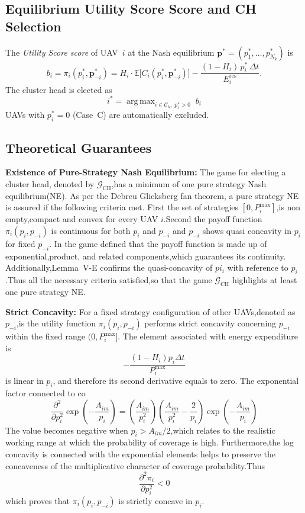 \documentclass[journal]{IEEEtran}
\DeclareMathOperator*{\argmax}{arg\,max}
\begin{document}
\subsection{Equilibrium Utility Score Score and CH Selection}

The \emph{Utility Score score} of UAV~$i$ at the Nash equilibrium
$\mathbf{p}^{*}=(p_{1}^{*},\ldots,p_{N_{k}}^{*})$ is
\begin{equation}\label{eq:Utility Score}
  b_{i}=\pi_{i}(p_{i}^{*},\mathbf{p}_{-i}^{*})
  =H_{i}\cdot\mathbb{E}\bigl[C_{i}(p_{i}^{*},\mathbf{p}_{-i}^{*})\bigr]
  -\frac{(1-H_{i})\,p_{i}^{*}\,\Delta t}{E_i^{\mathrm{res}}}.
\end{equation}
The cluster head is elected as
\begin{equation}\label{eq:CH}
  i^{*}=\argmax_{i\in\mathcal{C}_{k},\;p_{i}^{*}>0}\;b_{i}
\end{equation}
UAVs with $p_{i}^{*}=0$ (Case~C) are automatically
excluded.


\subsection{Theoretical Guarantees}

\textbf{Existence of Pure-Strategy Nash Equilibrium:}
The game for electing a cluster head, denoted by $\mathcal{G}_{\mathrm{CH}}$,has a minimum of one pure strategy Nash equilibrium(NE). As per the Debreu Glicksberg fan theorem, a pure strategy NE is assured if the following criteria met. First the set of strategies  $[0,P_i^{\max}]$,is non empty,compact and convex for every UAV $i$.Second the payoff function  $\pi_i(p_i,p_{-i})$ is continuous for both $p_i$ and $p_{-i}$ and  $p_{-i}$ shows quasi concavity in $p_i$ for fixed $p_{-i}$. In the game defined that the payoff function is made up of exponential,product, and related components,which guarantees its continuity. Additionally,Lemma~V-E confirms the quasi-concavity of $pi_i$ with reference to $p_i$.Thus all the necessary criteria satisfied,so that the game  $\mathcal{G}_{\mathrm{CH}}$ highlights at least one pure strategy NE.

\textbf{Strict Concavity:}
For a fixed strategy configuration of other UAVs,denoted as $p_{-i}$,is the utility function  $\pi_i(p_i,p_{-i})$ performs strict concavity concerning $p_{-i}$ within the fixed range  $(0,P_i^{\max}]$. The element associated with energy expenditure is \[
-\frac{(1-H_i)p_i\Delta t}{P_i^{\max}}
\]
is linear in $p_i$, and therefore its second derivative equals to zero. The exponential factor connected to co
\[
\frac{\partial^2}{\partial p_i^2}\exp\left(-\frac{A_{im}}{p_i}\right)
=
\left(\frac{A_{im}}{p_i^2}\right)
\left(\frac{A_{im}}{p_i^2}-\frac{2}{p_i}\right)
\exp\left(-\frac{A_{im}}{p_i}\right)
\]
The value becomes negative   when  $p_i>A_{im}/2$,which relates to the realistic working range at which the probability of coverage is high. Furthermore,the log concavity is connected with the exponential elements helps to preserve the concaveness of the multiplicative character of coverage probability.Thus
\[
\frac{\partial^2 \pi_i}{\partial p_i^2}<0
\]
which proves that $\pi_i(p_i,p_{-i})$ is strictly concave in $p_i$.
\end{document}
